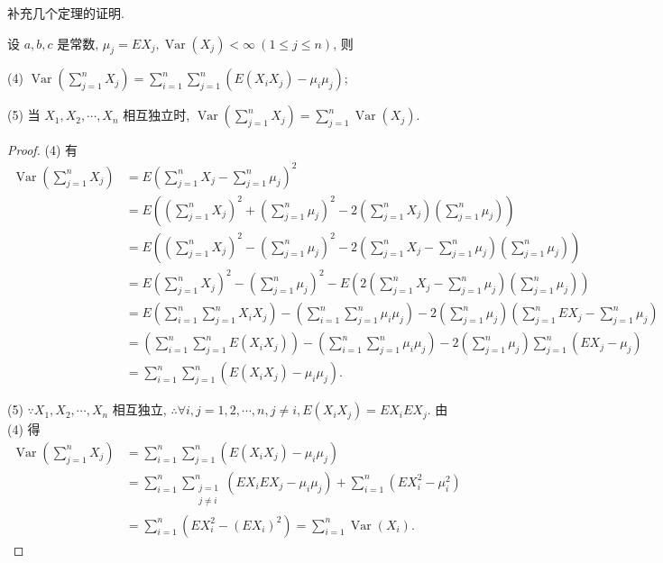 \documentclass{ctexart}
\begin{document}
补充几个定理的证明.
\begin{theorem}[书上的定理 5.2]\label{t9.1}
    设 $a,b,c$ 是常数, $\mu_j=EX_j,\operatorname{Var}(X_j)<\infty\ (1\leq j\leq n)$, 则
    
    (4) $\operatorname{Var}\left(\sum\limits_{j=1}^nX_j\right)=\sum\limits_{i=1}^n\sum\limits_{j=1}^n(E(X_iX_j)-\mu_i\mu_j)$;
    
    (5) 当 $X_1,X_2,\cdots,X_n$ 相互独立时, $\operatorname{Var}\left(\sum\limits_{j=1}^nX_j\right)=\sum\limits_{j=1}^n\operatorname{Var}(X_j)$.
\end{theorem}
\begin{proof}
    (4) 有
    \begin{align*}
        \operatorname{Var}\left(\sum\limits_{j=1}^nX_j\right) & =E\left(\sum\limits_{j=1}^nX_j-\sum\limits_{j=1}^n\mu_j\right)^2 \\
        & =E\left(\left(\sum\limits_{j=1}^nX_j\right)^2+\left(\sum\limits_{j=1}^n\mu_j\right)^2-2\left(\sum\limits_{j=1}^nX_j\right)\left(\sum\limits_{j=1}^n\mu_j\right)\right) \\
        & =E\left(\left(\sum\limits_{j=1}^nX_j\right)^2-\left(\sum\limits_{j=1}^n\mu_j\right)^2-2\left(\sum\limits_{j=1}^nX_j-\sum\limits_{j=1}^n\mu_j\right)\left(\sum\limits_{j=1}^n\mu_j\right)\right) \\
        & =E\left(\sum\limits_{j=1}^nX_j\right)^2-\left(\sum\limits_{j=1}^n\mu_j\right)^2-E\left(2\left(\sum\limits_{j=1}^nX_j-\sum\limits_{j=1}^n\mu_j\right)\left(\sum\limits_{j=1}^n\mu_j\right)\right) \\
        & =E\left(\sum\limits_{i=1}^n\sum\limits_{j=1}^nX_iX_j\right)-\left(\sum\limits_{i=1}^n\sum\limits_{j=1}^n\mu_i\mu_j\right)-2\left(\sum\limits_{j=1}^n\mu_j\right)\left(\sum\limits_{j=1}^nEX_j-\sum\limits_{j=1}^n\mu_j\right) \\
        & =\left(\sum\limits_{i=1}^n\sum\limits_{j=1}^nE(X_iX_j)\right)-\left(\sum\limits_{i=1}^n\sum\limits_{j=1}^n\mu_i\mu_j\right)-2\left(\sum\limits_{j=1}^n\mu_j\right)\sum\limits_{j=1}^n(EX_j-\mu_j) \\
        & =\sum\limits_{i=1}^n\sum\limits_{j=1}^n(E(X_iX_j)-\mu_i\mu_j).
    \end{align*}

    (5) $\because X_1,X_2,\cdots,X_n$ 相互独立, $\therefore\forall i,j=1,2,\cdots,n,j\neq i,E(X_iX_j)=EX_iEX_j$. 由 (4) 得
    \begin{align*}
        \operatorname{Var}\left(\sum\limits_{j=1}^nX_j\right) & =\sum\limits_{i=1}^n\sum\limits_{j=1}^n(E(X_iX_j)-\mu_i\mu_j) \\
        & =\sum\limits_{i=1}^n\sum\limits_{\substack{j=1\\j\neq i}}^n(EX_iEX_j-\mu_i\mu_j)+\sum\limits_{i=1}^n(EX_i^2-\mu_i^2) \\
        & =\sum\limits_{i=1}^n(EX_i^2-(EX_i)^2)=\sum\limits_{i=1}^n\operatorname{Var}(X_i).
    \end{align*}
\end{proof}
\end{document}
